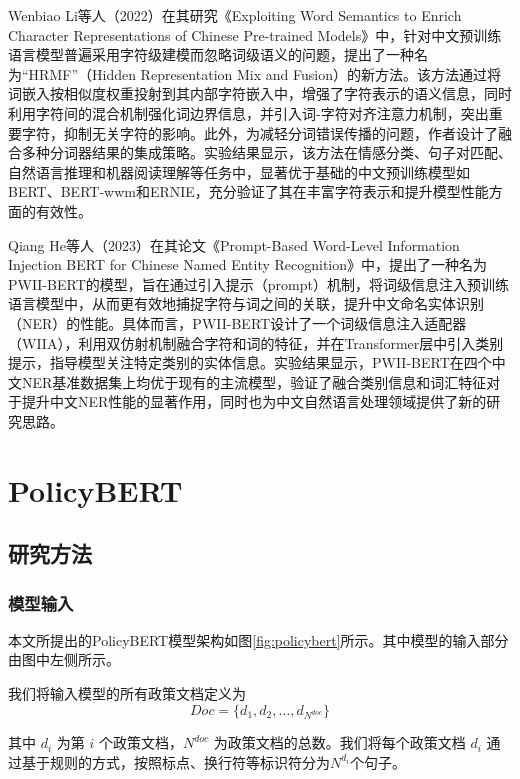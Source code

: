 \documentclass[12pt, a4paper]{ctexart}
\begin{document}
Wenbiao Li等人（2022）在其研究《Exploiting Word Semantics to Enrich Character Representations of Chinese Pre-trained Models》中，针对中文预训练语言模型普遍采用字符级建模而忽略词级语义的问题，提出了一种名为“HRMF”（Hidden Representation Mix and Fusion）的新方法\cite{Li2022ExploitingWS}。该方法通过将词嵌入按相似度权重投射到其内部字符嵌入中，增强了字符表示的语义信息，同时利用字符间的混合机制强化词边界信息，并引入词-字符对齐注意力机制，突出重要字符，抑制无关字符的影响。此外，为减轻分词错误传播的问题，作者设计了融合多种分词器结果的集成策略。实验结果显示，该方法在情感分类、句子对匹配、自然语言推理和机器阅读理解等任务中，显著优于基础的中文预训练模型如BERT、BERT-wwm和ERNIE，充分验证了其在丰富字符表示和提升模型性能方面的有效性。

Qiang He等人（2023）在其论文《Prompt-Based Word-Level Information Injection BERT for Chinese Named Entity Recognition》中，提出了一种名为PWII-BERT的模型，旨在通过引入提示（prompt）机制，将词级信息注入预训练语言模型中，从而更有效地捕捉字符与词之间的关联，提升中文命名实体识别（NER）的性能\cite{He2023PromptBasedWI}。具体而言，PWII-BERT设计了一个词级信息注入适配器（WIIA），利用双仿射机制融合字符和词的特征，并在Transformer层中引入类别提示，指导模型关注特定类别的实体信息。实验结果显示，PWII-BERT在四个中文NER基准数据集上均优于现有的主流模型，验证了融合类别信息和词汇特征对于提升中文NER性能的显著作用，同时也为中文自然语言处理领域提供了新的研究思路。



\section{PolicyBERT}
\subsection{研究方法}

\subsubsection{模型输入}
本文所提出的PolicyBERT模型架构如图\ref{fig:policybert}所示。其中模型的输入部分由图中左侧所示。

我们将输入模型的所有政策文档定义为 
\begin{equation}
    Doc = \{d_1, d_2, \dots, d_{N^{doc}}\} 
\end{equation}

其中 $d_i$ 为第 $i$ 个政策文档，${N^{doc}}$ 为政策文档的总数。我们将每个政策文档 $d_i$ 通过基于规则的方式，按照标点、换行符等标识符分为$N^{d_i}$个句子。 
\end{document}
